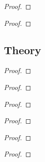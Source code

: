 \begin{proof}
\end{proof}

\newpage
\begin{exercise}
\end{exercise}

\begin{proof}
\end{proof}

\subsection*{Theory}

\newpage
\begin{exercise}
\end{exercise}

\begin{proof}
\end{proof}

\newpage
\begin{exercise}
\end{exercise}

\begin{proof}
\end{proof}

\newpage
\begin{exercise}
\end{exercise}

\begin{proof}
\end{proof}

\newpage
\begin{exercise}
\end{exercise}

\begin{proof}
\end{proof}

\newpage
\begin{exercise}
\end{exercise}

\begin{proof}
\end{proof}

\newpage
\begin{exercise}
\end{exercise}

\begin{proof}
\end{proof}

